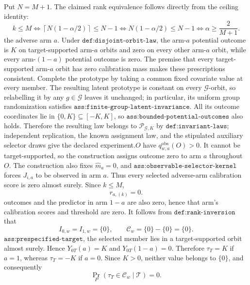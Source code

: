 Put \(N=M+1\). The claimed rank equivalence follows directly from the ceiling identity: \n\[k\le M\iff \left\lceil N(1-\alpha/2)\right\rceil\le N-1\iff N(1-\alpha/2)\le N-1\iff \alpha\ge\frac{2}{M+1}.\]\nFix the adverse arm \(a\). Under \(\texttt{def:disjoint-orbit-law}\), the arm-\(a\) potential outcome is \(K\) on target-supported arm-\(a\) orbits and zero on every other arm-\(a\) orbit, while every arm-\((1-a)\) potential outcome is zero. The premise that every target-supported arm-\(a\) orbit has zero calibration mass makes these prescriptions consistent. Complete the prototype by taking a common fixed covariate value at every member. The resulting latent prototype is constant on every \(\mathcal G\)-orbit, so relabelling it by any \(g\in\mathcal G\) leaves it unchanged; in particular, its uniform group randomization satisfies \(\texttt{ass:finite-group-latent-invariance}\). All its outcome coordinates lie in \(\{0,K\}\subseteq[-K,K]\), so \(\texttt{ass:bounded-potential-outcomes}\) also holds. Therefore the resulting law belongs to \(\mathcal P_{\mathcal G,K}\) by \(\texttt{def:invariant-laws}\); independent replication, the known assignment law, and the stipulated auxiliary selector draws give the declared experiment.\n\nLet \(O\) have \(q^{\mathrm{obs}}_{w,a}(O)>0\). It cannot be target-supported, so the construction assigns outcome zero to arm \(a\) throughout \(O\). The construction also fixes \(\widehat m_a=0\), and \(\texttt{ass:observable-selector-kernel}\) forces \(J_{i,a}\) to be observed in arm \(a\). Thus every selected adverse-arm calibration score is zero almost surely. Since \(k\le M\),\n\[r_{a,(k)}=0.\]\nAll outcomes and the predictor in arm \(1-a\) are also zero, hence that arm's calibration scores and threshold are zero. It follows from \(\texttt{def:rank-inversion}\) that\n\[I_{0,w}=I_{1,w}=\{0\},\qquad \mathcal C_w=\{0\}-\{0\}=\{0\}.\]\nBy \(\texttt{ass:prespecified-target}\), the selected member lies in a target-supported orbit almost surely. Hence \(Y_{0T}(a)=K\) and \(Y_{0T}(1-a)=0\). Therefore \(\tau_T=K\) if \(a=1\), whereas \(\tau_T=-K\) if \(a=0\). Since \(K>0\), neither value belongs to \(\{0\}\), and consequently\n\[\Pr_P(\tau_T\in\mathcal C_w\mid\mathcal T)=0.\]